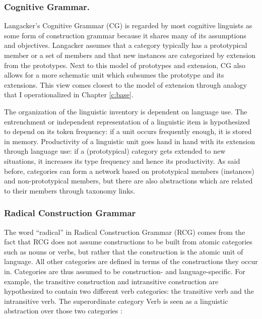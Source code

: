 \subsubsection{Cognitive Grammar.}
Langacker's Cognitive Grammar (CG) is regarded by most cognitive linguists as some form of construction grammar because it shares many of its assumptions and objectives. Langacker assumes that a category typically has a prototypical member or a set of members and that new instances are categorized by extension from the prototypes. Next to this model of prototypes and extension, CG also allows for a more schematic unit which subsumes the prototype and its extensions. This view comes closest to the model of extension through analogy that I operationalized in Chapter \ref{c:base}.

The organization of the linguistic inventory is dependent on language use. The entrenchment or independent representation of a linguistic item is hypothesized to depend on its token frequency: if a unit occurs frequently enough, it is stored in memory. Productivity of a linguistic unit goes hand in hand with its extension through language use: if a (prototypical) category gets extended to new situations, it increases its type frequency and hence its productivity. As said before, categories can form a network based on prototypical members (instances) and non-prototypical members, but there are also abstractions which are related to their members through taxonomy links.


\subsubsection{Radical Construction Grammar}
The word ``radical'' in Radical Construction Grammar (RCG) comes from the fact that RCG does not assume constructions to be built from atomic categories such as nouns or verbs, but rather that the construction is the atomic unit of language. All other categories are defined in terms of the constructions they occur in. Categories are thus assumed to be construction- and language-specific. For example, the transitive construction and intransitive construction are hypothesized to contain two different verb categories: the transitive verb and the intransitive verb. The superordinate category Verb is seen as a linguistic abstraction over those two categories \citep[p. 287--288]{croft04cognitive}:

